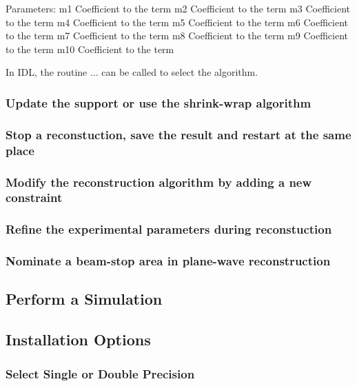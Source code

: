 \documentclass[]{nadia}
\begin{document}
Parameters:
m1 	Coefficient to the  term
m2 	Coefficient to the  term
m3 	Coefficient to the  term
m4 	Coefficient to the  term
m5 	Coefficient to the  term
m6 	Coefficient to the  term
m7 	Coefficient to the  term
m8 	Coefficient to the  term
m9 	Coefficient to the  term
m10 	Coefficient to the  term




In IDL, the routine ... can be called to select the algorithm.


\subsubsection{Update the support or use the shrink-wrap algorithm}

\subsubsection{Stop a reconstuction, save the result and restart at the same place}

\subsubsection{Modify the reconstruction algorithm by adding a new constraint}

\subsubsection{Refine the experimental parameters during reconstuction}

\subsubsection{Nominate a beam-stop area in plane-wave reconstruction}



\subsection{Perform a Simulation}





\subsection{Installation Options}

\subsubsection{Select Single or Double Precision}
\end{document}

